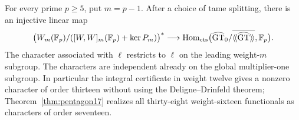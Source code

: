 \begin{theorem}\label{thm:topweight}
For every prime $p\geq5$, put $m=p-1$.  After a choice of tame splitting,
there is an injective linear map
\[
 \bigl(W_m(\mathbb F_p)/([W,W]_m(\mathbb F_p)+\ker P_m)\bigr)^*
 \longrightarrow
 \operatorname{Hom}_{\mathrm{cts}}\bigl(\widehat{\mathrm{GT}}_0/\overline{\langle\!\langle\widehat{\mathrm{GT}}\rangle\!\rangle},
                  \mathbb F_p\bigr).
\]
The character associated with $\ell$ restricts to $\ell$ on the leading
weight-$m$ subgroup.  The characters are independent already on the
global multiplier-one subgroup.  In particular the integral certificate
in weight twelve gives a nonzero character of order thirteen without
using the Deligne--Drinfeld theorem; Theorem~\ref{thm:pentagon17} realizes
all thirty-eight weight-sixteen functionals as characters of order
seventeen.
\end{theorem}
